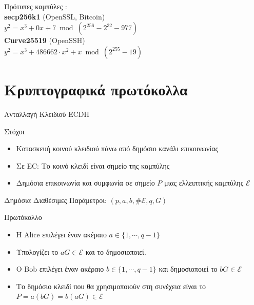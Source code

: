 \documentclass[handout]{beamer}
\begin{document}
\begin{frame}[allowframebreaks]{Πρότυπες καμπύλες}
:\\
\textbf{secp256k1}  (OpenSSL, Bitcoin) \\
$y^2 = x^3+0x+7 \bmod (2^{256} - 2^{32} - 977)$ \\

\textbf{Curve25519} (OpenSSH) \\
$y^2 = x^3+486662 \cdot x^2+x \bmod (2^{255}-19) $
\end{frame}

\section{Κρυπτογραφικά πρωτόκολλα}
\begin{frame}[allowframebreaks]{Ανταλλαγή Κλειδιού ECDH}
\begin{block}{Στόχοι}
\begin{itemize}
\item Κατασκευή κοινού κλειδιού πάνω από δημόσιο κανάλι επικοινωνίας
\item Σε EC: Το κοινό κλειδί είναι σημείο της καμπύλης
\item Δημόσια επικοινωνία και συμφωνία σε σημείο $P$  μιας ελλειπτικής καμπύλης $\mathcal E$
\end{itemize}
\end{block}

Δημόσια Διαθέσιμες Παράμετροι: $(p,a,b,\# \mathcal E,q,G)$
\framebreak
\begin{block}{Πρωτόκολλο}
\begin{itemize}
\item H {Alice} επιλέγει έναν ακέραιο $a \in \{1, \cdots, q-1 \}$
\item Υπολογίζει το $aG \in \mathcal E$ και το δημοσιοποιεί.
\item Ο {Bob} επιλέγει έναν ακέραιο $b \in \{1, \cdots, q-1 \}$ και δημοσιοποιεί το $bG \in \mathcal E$
\item Το δημόσιο κλειδί που θα χρησιμοποιούν στη συνέχεια είναι το $P=a(bG)=b(aG) \in \mathcal E$
\end{itemize}
\end{block}

\end{frame}
\end{document}
